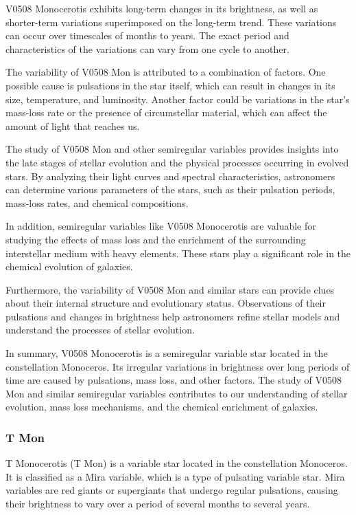 V0508 Monocerotis exhibits long-term changes in its brightness, as well as shorter-term variations superimposed on the long-term trend. These variations can occur over timescales of months to years. The exact period and characteristics of the variations can vary from one cycle to another.

The variability of V0508 Mon is attributed to a combination of factors. One possible cause is pulsations in the star itself, which can result in changes in its size, temperature, and luminosity. Another factor could be variations in the star's mass-loss rate or the presence of circumstellar material, which can affect the amount of light that reaches us.

The study of V0508 Mon and other semiregular variables provides insights into the late stages of stellar evolution and the physical processes occurring in evolved stars. By analyzing their light curves and spectral characteristics, astronomers can determine various parameters of the stars, such as their pulsation periods, mass-loss rates, and chemical compositions.

In addition, semiregular variables like V0508 Monocerotis are valuable for studying the effects of mass loss and the enrichment of the surrounding interstellar medium with heavy elements. These stars play a significant role in the chemical evolution of galaxies.

Furthermore, the variability of V0508 Mon and similar stars can provide clues about their internal structure and evolutionary status. Observations of their pulsations and changes in brightness help astronomers refine stellar models and understand the processes of stellar evolution.

In summary, V0508 Monocerotis is a semiregular variable star located in the constellation Monoceros. Its irregular variations in brightness over long periods of time are caused by pulsations, mass loss, and other factors. The study of V0508 Mon and similar semiregular variables contributes to our understanding of stellar evolution, mass loss mechanisms, and the chemical enrichment of galaxies.

\subsubsection*{ T Mon }
T Monocerotis (T Mon) is a variable star located in the constellation Monoceros. It is classified as a Mira variable, which is a type of pulsating variable star. Mira variables are red giants or supergiants that undergo regular pulsations, causing their brightness to vary over a period of several months to several years.

